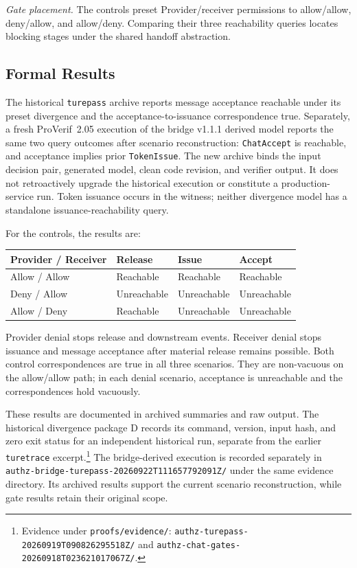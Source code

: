 \emph{Gate placement.} The controls preset Provider/receiver permissions to
allow/allow, deny/allow, and allow/deny. Comparing their three reachability
queries locates blocking stages under the shared handoff abstraction.


\subsection{Formal Results}

The historical \texttt{turepass} archive reports message acceptance reachable
under its preset divergence and the acceptance-to-issuance correspondence
true. Separately, a fresh ProVerif~2.05 execution of the bridge v1.1.1 derived
model reports the same two query outcomes after scenario reconstruction:
\texttt{ChatAccept} is reachable, and acceptance implies prior
\texttt{TokenIssue}. The new archive binds the input decision pair, generated
model, clean code revision, and verifier output. It does not retroactively
upgrade the historical execution or constitute a production-service run.
Token issuance occurs in the witness; neither divergence model has a
standalone issuance-reachability query.

For the controls, the results are:
\begin{center}
\begin{tabular}{llll}
\hline
Provider / Receiver & Release & Issue & Accept \\
\hline
Allow / Allow & Reachable & Reachable & Reachable \\
Deny / Allow & Unreachable & Unreachable & Unreachable \\
Allow / Deny & Reachable & Unreachable & Unreachable \\
\hline
\end{tabular}
\end{center}
Provider denial stops release and downstream events. Receiver denial stops
issuance and message acceptance after material release remains possible.
Both control correspondences are true in all three scenarios. They are
non-vacuous on the allow/allow path; in each denial scenario, acceptance is
unreachable and the correspondences hold vacuously.

These results are documented in archived summaries and raw output.
The historical divergence package D records its command, version,
input hash, and zero exit status for an independent historical run, separate
from the earlier \texttt{turetrace} excerpt.\footnote{Evidence under
\texttt{proofs/evidence/}: \texttt{authz-turepass-\allowbreak
20260919T090826295518Z/} and \texttt{authz-chat-gates-\allowbreak
20260918T023621017067Z/}.}
The bridge-derived execution is recorded separately in
\texttt{authz-bridge-turepass-\allowbreak 20260922T111657792091Z/}
under the same evidence directory. Its archived results support the current
scenario reconstruction, while gate results retain their original scope.

